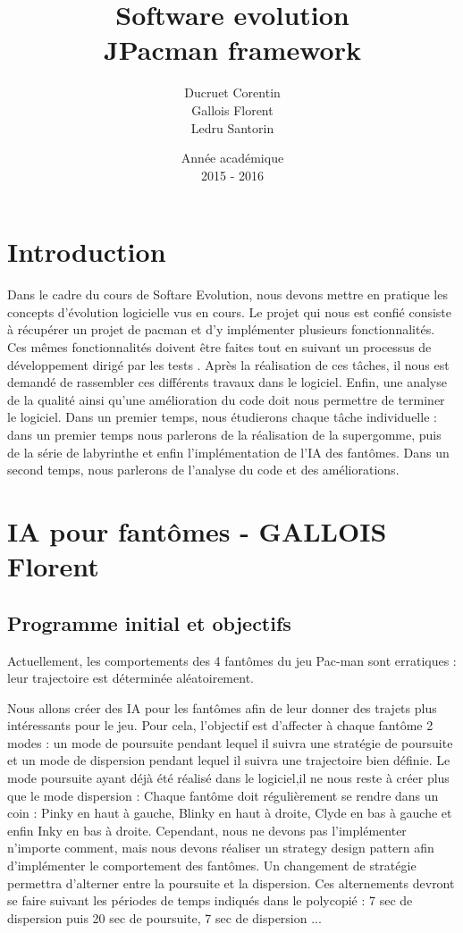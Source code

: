 \documentclass[a4paper,12pt]{report} %
\title{Software evolution \\ JPacman framework}
\author{Ducruet Corentin \\ Gallois Florent \\ Ledru Santorin}
\date{Année académique\\2015 - 2016}
\begin{document}
 
\maketitle
\newpage 
{} %
\tableofcontents
\newpage
\section{Introduction}

Dans le cadre du cours de Softare Evolution, nous devons mettre en pratique les concepts d'évolution logicielle vus en cours. Le projet qui nous est confié consiste à récupérer un projet de pacman et d'y implémenter plusieurs fonctionnalités. Ces mêmes fonctionnalités doivent être faites tout en suivant un processus de développement dirigé par les tests . Après la réalisation de ces tâches, il nous est demandé de rassembler ces différents travaux dans le logiciel. Enfin, une analyse de la qualité ainsi qu'une amélioration du code doit nous permettre de terminer le logiciel.
Dans un premier temps, nous étudierons chaque tâche individuelle : dans un premier temps nous parlerons de la réalisation de la supergomme, puis de la série de labyrinthe et enfin l'implémentation de l'IA des fantômes.
Dans un second temps, nous parlerons de l'analyse du code et des améliorations.

\section{IA pour fantômes - GALLOIS Florent}

\subsection{Programme initial et objectifs}
Actuellement, les comportements des 4 fantômes du jeu Pac-man sont erratiques : 
leur trajectoire est déterminée aléatoirement.

Nous allons créer des IA pour les fantômes afin de leur donner des trajets plus intéressants pour le jeu.
Pour cela, l'objectif est d'affecter à chaque fantôme 2 modes : un mode de poursuite pendant lequel il suivra une stratégie de poursuite et un mode de dispersion pendant lequel il suivra une trajectoire bien définie.
Le mode poursuite ayant déjà été réalisé dans le logiciel,il ne nous reste à créer plus que le mode dispersion : 
Chaque fantôme doit régulièrement se rendre dans un coin : Pinky en haut à gauche, Blinky en haut à droite, Clyde en bas à gauche et enfin Inky en bas à droite.
Cependant, nous ne devons pas l'implémenter n'importe comment, mais nous devons réaliser un strategy design pattern afin d'implémenter le comportement des fantômes.
Un changement de stratégie permettra d'alterner entre la poursuite et la dispersion.
Ces alternements devront se faire suivant les périodes de temps indiqués dans le polycopié : 7 sec de dispersion puis 20 sec de poursuite, 7 sec de dispersion ... 
\end{document}
